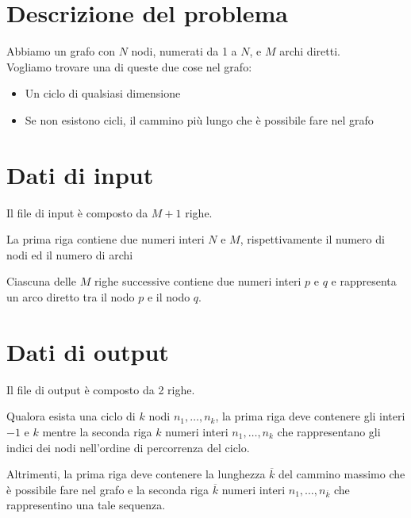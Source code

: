 \documentclass[a4paper,11pt]{article}
\begin{document}


\vspace{0.5cm}

\section*{Descrizione del problema}

    Abbiamo un grafo con $N$ nodi, numerati da 1 a $N$, e $M$ archi diretti.\\
    Vogliamo trovare una di queste due cose nel grafo:
    \begin{itemize}
        \item Un ciclo di qualsiasi dimensione
        \item Se non esistono cicli, il cammino più lungo che è possibile fare nel grafo
    \end{itemize}

\section*{Dati di input}

      Il file di input è composto da $M+1$ righe.

      La prima riga contiene due numeri interi $N$ e $M$,
      rispettivamente il numero di nodi ed il numero di archi

      Ciascuna delle $M$ righe successive contiene due numeri interi
      $p$ e $q$ e rappresenta un arco diretto tra il nodo $p$ e il nodo $q$.

\section*{Dati di output}

      Il file di output è composto da 2 righe.

      Qualora esista una ciclo di $k$ nodi $n_{1}, \ldots, n_{k}$,
      la prima riga deve contenere gli interi $-1$ e $k$
      mentre la seconda riga $k$ numeri interi $n_{1}, \ldots, n_{k}$
      che rappresentano gli indici dei nodi nell'ordine di percorrenza del ciclo.

      Altrimenti, la prima riga deve contenere
      la lunghezza $\overline{k}$ del cammino massimo che è possibile fare nel grafo e
      la seconda riga $\overline{k}$ numeri interi $n_{1}, \ldots, n_{\overline{k}}$
      che rappresentino una tale sequenza.
\end{document}
